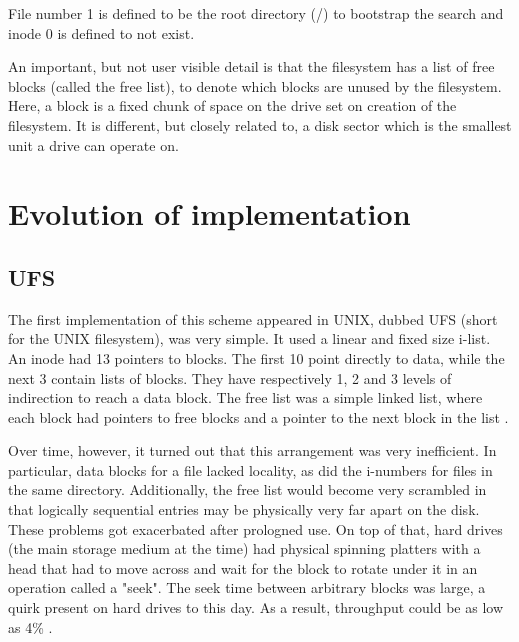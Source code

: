         File number 1 is defined to be the root directory (/) to bootstrap
        the search and inode 0 is defined to not exist.

        An important, but not user visible detail is that the filesystem has a
        list of free blocks (called the free list), to denote which blocks are
        unused by the filesystem. Here, a block is a fixed chunk of space on
        the drive set on creation of the filesystem. It is different, but
        closely related to, a disk sector which is the smallest unit a drive
        can operate on.

    \section{Evolution of implementation}

        \subsection{UFS}

            The first implementation of this scheme appeared in UNIX, dubbed
            UFS (short for the UNIX filesystem), was very simple.  It used a
            linear and fixed size i-list. An inode had 13 pointers to blocks.
            The first 10 point directly to data, while the next 3 contain lists
            of blocks. They have respectively 1, 2 and 3 levels of indirection
            to reach a data block. The free list was a simple linked list,
            where each block had pointers to free blocks and a pointer to the
            next block in the list \cite{UNIX_implementation,
            UNIX_source_commentary}.

            Over time, however, it turned out that this arrangement was very
            inefficient. In particular, data blocks for a file lacked locality,
            as did the i-numbers for files in the same directory. Additionally,
            the free list would become very scrambled in that logically
            sequential entries may be physically very far apart on the disk.
            These problems got exacerbated after prologned use. On top of that,
            hard drives (the main storage medium at the time) had physical
            spinning platters with a head that had to move across and wait for
            the block to rotate under it in an operation called a "seek". The
            seek time between arbitrary blocks was large, a quirk present on
            hard drives to this day. As a result, throughput could be as low as
            4\% \cite{FFS}.

